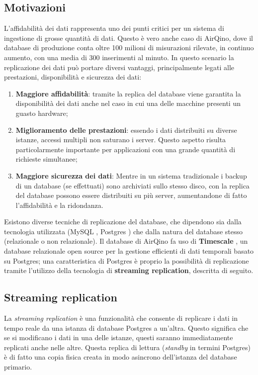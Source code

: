 \subsection{Motivazioni}\label{ssec:replica-motivazioni}
L'affidabilità dei dati rappresenta uno dei punti critici per un sistema di ingestione di grosse quantità di dati. Questo è vero anche caso di AirQino, dove il database di produzione conta oltre 100 milioni di misurazioni rilevate, in continuo aumento, con una media di 300 inserimenti al minuto. In questo scenario la replicazione dei dati può portare diversi vantaggi, principalmente legati alle prestazioni, disponibilità e sicurezza dei dati:
\begin{enumerate}
  \item \textbf{Maggiore affidabilità}: tramite la replica del database viene garantita la disponibilità dei dati anche nel caso in cui una delle macchine presenti un guasto hardware;
  \item \textbf{Miglioramento delle prestazioni}: essendo i dati distribuiti su diverse istanze, accessi multipli non saturano i server. Questo aspetto risulta particolarmente importante per applicazioni con una grande quantità di richieste simultanee;
  \item \textbf{Maggiore sicurezza dei dati}: Mentre in un sistema tradizionale i backup di un database (se effettuati) sono archiviati sullo stesso disco, con la replica del database possono essere distribuiti su più server, aumentandone di fatto l'affidabilità e la ridondanza.
\end{enumerate}

Esistono diverse tecniche di replicazione del database, che dipendono sia dalla tecnologia utilizzata (MySQL \cite{mysql}, Postgres \cite{postgres}) che dalla natura del database stesso (relazionale o non relazionale). Il database di AirQino fa uso di \textbf{Timescale} \cite{timescale}, un database relazionale open source per la gestione efficienti di dati temporali basato su Postgres; una caratteristica di Postgres è proprio la possibilità di replicazione tramite l'utilizzo della tecnologia di \textbf{streaming replication}, descritta di seguito.

\subsection{Streaming replication}\label{ssec:streaming-replication}
La \textit{streaming replication} è una funzionalità che consente di replicare i dati in tempo reale da una istanza di database Postgres a un'altra. Questo significa che se si modificano i dati in una delle istanze, questi saranno immediatamente replicati anche nelle altre. Questa replica di lettura (\textit{standby} in termini Postgres) è di fatto una copia fisica creata in modo asincrono dell'istanza del database primario.

